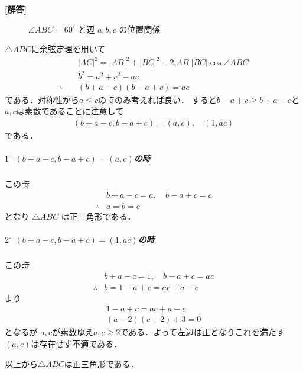 \documentclass[../../main.tex]{subfiles}
\begin{document}
\begin{oframed}
  
\end{oframed}

{\bf [解答]}

\begin{figure}[htbp]
  \centering
  \caption{$\angle ABC=60^\circ$ と辺 $a,b,c$ の位置関係}
\end{figure}

$\triangle ABC$に余弦定理を用いて
\begin{align}
  &|AC|^2 = |AB|^2 + |BC|^2 - 2|AB||BC|\cos\angle ABC \\
  &b^2 = a^2+c^2-ac \\
  \therefore \quad
  &(b+a-c)(b-a+c) = ac
\end{align}
である．対称性から$a \le c$の時のみ考えれば良い．
すると$b-a+c \ge b+a-c$と$a, c$は素数であることに注意して
\begin{align}
  (b+a-c, b-a+c) = (a, c), \quad (1, ac) \label{eq:1}
\end{align}
である．

\subparagraph{$1^{\circ}$ $(b+a-c, b-a+c) = (a, c)$の時}

この時
\begin{align}
  & b+a-c = a, \quad b-a+c = c \\
  \therefore
  & a=b=c
\end{align}
となり $\triangle ABC$ は正三角形である．

\subparagraph{$2^{\circ}$ $(b+a-c, b-a+c) = (1, ac)$の時}

この時
\begin{align}
  & b+a-c = 1, \quad b-a+c = ac \\
  \therefore
  & b=1-a+c=ac+a-c
\end{align}
より
\begin{align}
  1-a+c = ac+a-c \\
  (a-2)(c+2)+3 = 0
\end{align}
となるが $a, c$が素数ゆえ$a, c \ge 2$である．よって左辺は正となりこれを満たす$(a,c)$は存在せず不適である．
\casesend

以上から$\triangle ABC$は正三角形である．
\end{document}
